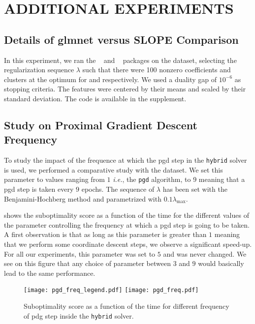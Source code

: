 \section{ADDITIONAL EXPERIMENTS}\label{sec:add_expes}

\subsection{Details of \textsf{glmnet} versus \textsf{SLOPE} Comparison}
\label{sec:slope-vs-glmnet}

In this experiment, we ran the ~\parencite{friedman2022} and ~\parencite{larsson2022d} packages on the  dataset, selecting the regularization sequence \(\lambda\) such that there were 100 nonzero coefficients and clusters at the optimum for  and  respectively.
We used a duality gap of \(10^{-6}\) as stopping criteria.
The features were centered by their means and scaled by their standard deviation.
The code is available in the supplement.

\subsection{Study on Proximal Gradient Descent Frequency}
To study the impact of the frequence at which the pgd step in the \texttt{hybrid} solver is used, we performed a comparative study with the  dataset. 
We set this parameter to values ranging from $1$ \textit{i.e.}, the \texttt{pgd} algorithm, to 9 meaning that a pgd step is taken every $9$ epochs. 
The sequence of $\lambda$ has been set with the Benjamini-Hochberg method and parametrized with $0.1 \lambda_{\text{max}}$. 

 shows the suboptimality score as a function of the time for the different values of the parameter controlling the frequency at which a pgd step is going to be taken. 
A first observation is that as long as this parameter is greater than $1$ meaning that we perform some coordinate descent steps, we observe a significant speed-up. 
For all our experiments, this parameter was set to $5$ and was never changed. 
We see on this figure that any choice of parameter between $3$ and $9$ would basically lead to the same performance. 

\begin{figure*}[htb]
  \centering
  \texttt{[image: pgd\_freq\_legend.pdf]}
  \texttt{[image: pgd\_freq.pdf]}
  \caption{Suboptimality score as a function of the time for different frequency of pdg step inside the \texttt{hybrid} solver.}
  \label{fig:pgd_freq}
\end{figure*}

